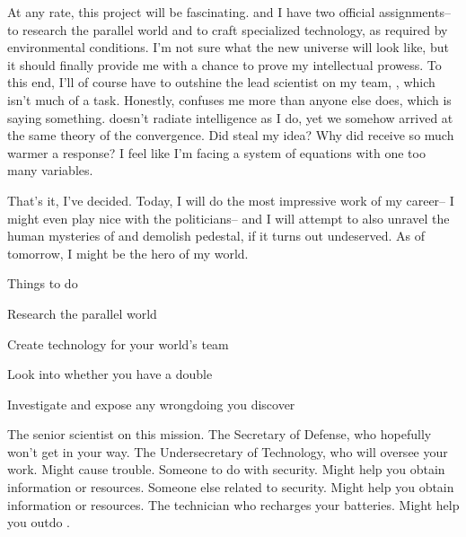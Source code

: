\documentclass[char]{guildcamp3}
\begin{document}
At any rate, this project will be fascinating. \cSciOne{} and I have two official assignments-- to research the parallel world and to craft specialized technology, as required by environmental conditions. I'm not sure what the new universe will look like, but it should finally provide me with a chance to prove my intellectual prowess. To this end, I'll of course have to outshine the lead scientist on my team, \cSciOne{}, which isn't much of a task. Honestly, \cSciOne{} confuses me more than anyone else does, which is saying something. \cSciOne{\they} doesn't radiate intelligence as I do, yet we somehow arrived at the same theory of the convergence. Did \cSciOne{\they} steal my idea? Why did \cSciOne{\they} receive so much warmer a response? I feel like I'm facing a system of equations with one too many variables.

That's it, I've decided. Today, I will do the most impressive work of my career-- I might even play nice with the politicians-- and I will attempt to also unravel the human mysteries of \cSciOne{} and demolish \cSciOne{\their} pedestal, if it turns out undeserved. As of tomorrow, I might be the hero of my world.

\begin{itemz}[Goals]
  \item Things to do
  \item Research the parallel world
  \item Create technology for your world's team
  \item Look into whether you have a double
  \item Investigate \cSciOne{} and expose any wrongdoing you discover
\end{itemz}


\begin{contacts}
  \contact{\cSciOne{}} The senior scientist on this mission.
  \contact{\cPoliOne{}} The Secretary of Defense, who hopefully won't get in your way.
  \contact{\cPoliTwo{}} The Undersecretary of Technology, who will oversee your work. Might cause trouble.
  \contact{\cSpecOpOne{}} Someone to do with security. Might help you obtain information or resources.
  \contact{\cSpecOpTwo{}} Someone else related to security. Might help you obtain information or resources.
  \contact{\cTech{}} The technician who recharges your batteries. Might help you outdo \cSciOne{}.
\end{contacts}


\end{document}
